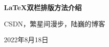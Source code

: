 \documentclass[UTF8, oneside]{ctexbook}
\begin{document}
\begin{titlepage}
  \begin{center}
    \quad

    \vspace{.2\textheight}
    \Huge\textbf{LaTeX双栏排版方法介绍}

    \vspace{2ex}
    \normalsize CSDN，繁星间漫步，陆巍的博客

    \vfill
    2022年8月18日
  \end{center}
\end{titlepage}


\tableofcontents%


\mainmatter
\end{document}
